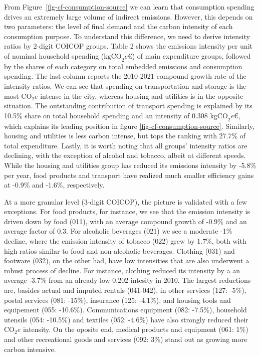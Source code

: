 \documentclass[
  10pt,
  twocolumn]{aft}
\begin{document}
From Figure~\ref{fig-cf-consumption-source} we can learn that
consumption spending drives an extremely large volume of indirect
emissions. However, this depends on two parameters: the level of final
demand and the carbon intensity of each consumption purpose. To
understand this difference, we need to derive intensity ratios by
2-digit COICOP groups. Table 2 shows the emissions intensity per unit of
nominal household spending (\(\text{kgCO}_2e\)\euro{}) of main
expenditure groups, followed by the shares of each category on total
embedded emissions and consumption spending. The last column reports the
2010-2021 compound growth rate of the intensity ratios. We can see that
spending on transportation and storage is the most \(\text{CO}_2e\)
intense in the city, whereas housing and utilities is in the opposite
situation. The outstanding contribution of transport spending is
explained by its 10.5\% share on total household spending and an
intensity of 0.308 \(\text{kgCO}_2e\)\euro{}, which explains its leading
position in figure \ref{fig-cf-consumption-source}. Similarly, housing
and utilities is less carbon intense, but tops the ranking with 27.7\%
of total expenditure. Lastly, it is worth noting that all groups'
intensity ratios are declining, with the exception of alcohol and
tobacco, albeit at different speeds. While the housing and utilities
group has reduced its emissions intensity by -5.8\% per year, food
products and transport have realized much smaller efficiency gains at
-0.9\% and -1.6\%, respectively.

At a more granular level (3-digit COICOP), the picture is validated with
a few exceptions. For food products, for instance, we see that the
emission intensity is driven down by food (011), with an average
compound growth of -0.9\% and an average factor of 0.3. For alcoholic
beverages (021) we see a moderate -1\% decline, where the emission
intensity of tobacco (022) grew by 1.7\%, both with high ratios similar
to food and non-alcoholic beverages. Clothing (031) and footware (032),
on the other had, have low intensities that are also underwent a robust
process of decline. For instance, clothing reduced its intensity by a an
average -3.7\% from an already low 0.202 intesity in 2010. The largest
reductions are, basides actual and imputed rentals (041-042), in other
services (127: -5\%), postal services (081: -15\%), insurance (125:
-4.1\%), and housing tools and equipement (055: -10.6\%). Communications
equipment (082: -7.5\%), household utensils (054: -10.5\%) and textiles
(052: -4.6\%) have also strongly reduced their \(\text{CO}_2e\)
intensity. On the oposite end, medical products and equipment (061: 1\%)
and other recreational goods and services (092: 3\%) stand out as
growing more carbon intensive.
\end{document}
